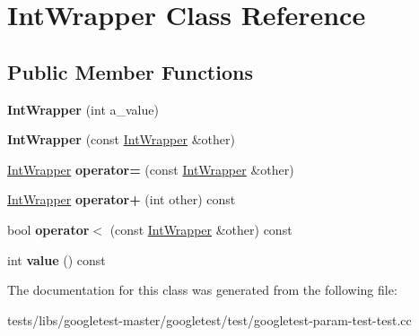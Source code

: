 \hypertarget{classIntWrapper}{}\section{Int\+Wrapper Class Reference}
\label{classIntWrapper}
\subsection*{Public Member Functions}
\begin{DoxyCompactItemize}
\item 
\mbox{\label{classIntWrapper_a1d35e0d0b9c0fc109a8d2a2118ae6010}} 
{\bfseries Int\+Wrapper} (int a\+\_\+value)
\item 
\mbox{\label{classIntWrapper_af23efe3c8d8bf176948922b41e8f253e}} 
{\bfseries Int\+Wrapper} (const \hyperlink{classIntWrapper}{Int\+Wrapper} \&other)
\item 
\mbox{\label{classIntWrapper_a39077b3c0eb1dd8a296a81bfb0a047b3}} 
\hyperlink{classIntWrapper}{Int\+Wrapper} {\bfseries operator=} (const \hyperlink{classIntWrapper}{Int\+Wrapper} \&other)
\item 
\mbox{\label{classIntWrapper_abf97bd11dd2825f3cb9e4d9f48152b56}} 
\hyperlink{classIntWrapper}{Int\+Wrapper} {\bfseries operator+} (int other) const
\item 
\mbox{\label{classIntWrapper_a940fd2978cdf7849281f11b32df94163}} 
bool {\bfseries operator$<$} (const \hyperlink{classIntWrapper}{Int\+Wrapper} \&other) const
\item 
\mbox{\label{classIntWrapper_a6103e9dc5eb94678985e3c2ac481b508}} 
int {\bfseries value} () const
\end{DoxyCompactItemize}


The documentation for this class was generated from the following file\+:\begin{DoxyCompactItemize}
\item 
tests/libs/googletest-\/master/googletest/test/googletest-\/param-\/test-\/test.\+cc\end{DoxyCompactItemize}
